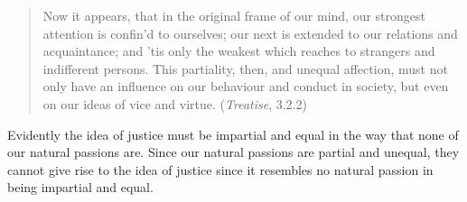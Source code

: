 \begin{quote}
	Now it appears, that in the original frame of our mind, our strongest attention is confin'd to ourselves; our next is extended to our relations and acquaintance; and 'tis only the weakest which reaches to strangers and indifferent persons. This partiality, then, and unequal affection, must not only have an influence on our behaviour and conduct in society, but even on our ideas of vice and virtue. (\emph{Treatise}, 3.2.2)
\end{quote}

Evidently the idea of justice must be impartial and equal in the way that none of our natural passions are. Since our natural passions are partial and unequal, they cannot give rise to the idea of justice since it resembles no natural passion in being impartial and equal.

% 


